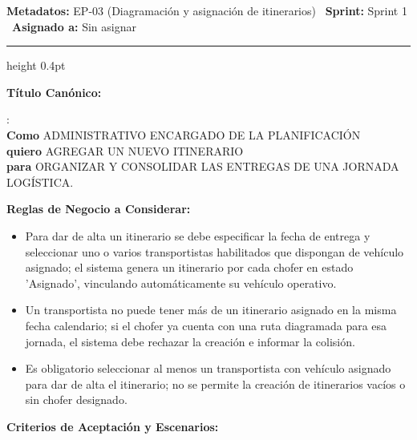 \documentclass[a4paper,9pt]{article}
\begin{document}
\begin{tcolorbox}[hucard, title={\textbf{HU-13: AGREGAR ITINERARIO} \hfill \scriptsize \colorbox{tealstatus}{\textbf{\ Accepted\ }} \quad \colorbox{white}{\textcolor{primarydark}{\textbf{\ 5 pts\ }}}}]
\vspace{-1pt}
\noindent\textbf{\footnotesize Metadatos:} EP-03 (Diagramación y asignación de itinerarios) \textbar\ \textbf{Sprint:} Sprint 1 \textbar\ \textbf{Asignado a:} Sin asignar\par\vspace{2pt}
\hrule height 0.4pt\par\vspace{3pt}
\noindent\textbf{\footnotesize Título Canónico:}\par\vspace{1pt}
{\small : \\ \textbf{Como} ADMINISTRATIVO ENCARGADO DE LA PLANIFICACIÓN \\ \textbf{quiero} AGREGAR UN NUEVO ITINERARIO \\ \textbf{para} ORGANIZAR Y CONSOLIDAR LAS ENTREGAS DE UNA JORNADA LOGÍSTICA.}\par\vspace{3pt}
\noindent\textbf{\footnotesize Reglas de Negocio a Considerar:}\par\vspace{1pt}
{\footnotesize
\begin{itemize}[leftmargin=12pt, nosep, itemsep=1.5pt, topsep=1pt]
\item Para dar de alta un itinerario se debe especificar la fecha de entrega y seleccionar uno o varios transportistas habilitados que dispongan de vehículo asignado; el sistema genera un itinerario por cada chofer en estado 'Asignado', vinculando automáticamente su vehículo operativo.
\item Un transportista no puede tener más de un itinerario asignado en la misma fecha calendario; si el chofer ya cuenta con una ruta diagramada para esa jornada, el sistema debe rechazar la creación e informar la colisión.
\item Es obligatorio seleccionar al menos un transportista con vehículo asignado para dar de alta el itinerario; no se permite la creación de itinerarios vacíos o sin chofer designado.
\end{itemize}
}\par\vspace{3pt}
\noindent\textbf{\footnotesize Criterios de Aceptación y Escenarios:}\par\vspace{2pt}

\end{tcolorbox}
\end{document}
